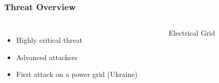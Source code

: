 \begin{frame}
\frametitle{Threat Overview}

\begin{columns}
\vspace{-15mm}
\begin{itemize}
    \item Highly critical threat
    \item Advanced attackers
    \item First attack on a power grid (Ukraine)
\end{itemize}

\begin{figure}[b]
\caption*{Electrical Grid}
\end{figure}
\end{columns}
\end{frame}
